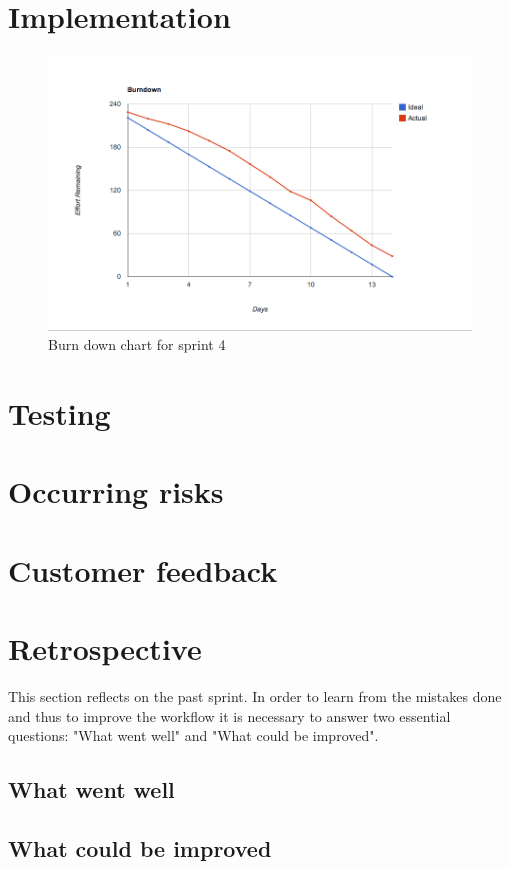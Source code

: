 \section{Implementation}
\begin{figure}[H]
	\centering
		\includegraphics[width=18cm]{sprint4/BurndownSprint4.png}
	\caption{Burn down chart for sprint 4}
	\label{fig:Burn4 }
\end{figure}
\section{Testing}
\section{Occurring risks}
\section{Customer feedback}
\section{Retrospective}
This section reflects on the past sprint. In order to learn from the mistakes done and thus to improve the workflow it is necessary to answer two essential questions: "What went well" and "What could be improved".

\subsection{What went well}
\subsection{What could be improved}
